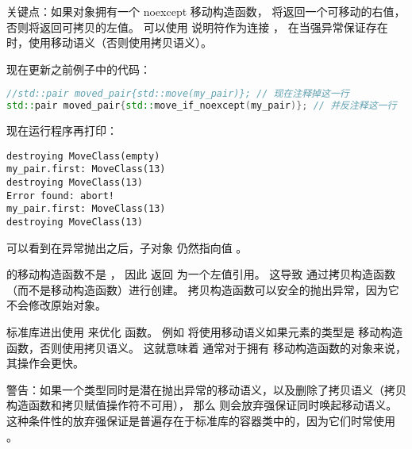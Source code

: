 \documentclass[../../LearnCpp.tex]{subfiles}
\begin{document}
关键点：如果对象拥有一个 noexcept 移动构造函数，
 将返回一个可移动的右值，
否则将返回可拷贝的左值。
可以使用  说明符作为连接 ，
在当强异常保证存在时，使用移动语义（否则使用拷贝语义）。

现在更新之前例子中的代码：

\begin{lstlisting}[language=C++]
//std::pair moved_pair{std::move(my_pair)}; // 现在注释掉这一行
std::pair moved_pair{std::move_if_noexcept(my_pair)}; // 并反注释这一行
\end{lstlisting}

现在运行程序再打印：

\begin{lstlisting}
destroying MoveClass(empty)
my_pair.first: MoveClass(13)
destroying MoveClass(13)
Error found: abort!
my_pair.first: MoveClass(13)
destroying MoveClass(13)
\end{lstlisting}

可以看到在异常抛出之后，子对象  仍然指向值 。

 的移动构造函数不是 ，
因此  返回  为一个左值引用。
这导致  通过拷贝构造函数（而不是移动构造函数）进行创建。
拷贝构造函数可以安全的抛出异常，因为它不会修改原始对象。

标准库进出使用  来优化  函数。
例如  将使用移动语义如果元素的类型是  移动构造函数，否则使用拷贝语义。
这就意味着  通常对于拥有  移动构造函数的对象来说，其操作会更快。

警告：如果一个类型同时是潜在抛出异常的移动语义，以及删除了拷贝语义（拷贝构造函数和拷贝赋值操作符不可用），
那么  则会放弃强保证同时唤起移动语义。
这种条件性的放弃强保证是普遍存在于标准库的容器类中的，因为它们时常使用 。
\end{document}
